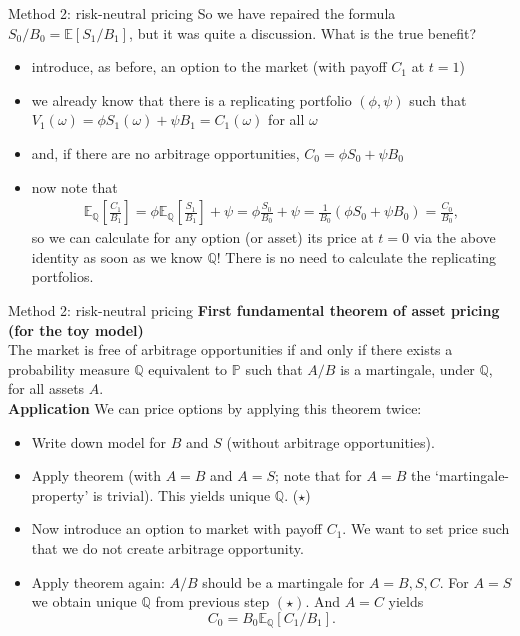 \documentclass[pdf, handout]{beamer}
\begin{document}
\begin{frame}{Method 2: risk-neutral pricing}
So we have repaired the formula  $S_0/B_0 = \mathbb{E}[S_1/B_1]$, but it 
was quite a discussion.  What is the true benefit?
\begin{itemize}
\item introduce, as before, an option to the market (with payoff $C_1$ at $t=1$)
\item we already know that there is a replicating portfolio $(\phi,\psi)$ such that $V_1(\omega) =\phi S_1(\omega) + \psi B_1= C_1(\omega)$ for all $\omega$
\item and, if there are no arbitrage opportunities, $C_0=\phi S_0 + \psi B_0$
\item now note that
\begin{align*}
\mathbb{E}_{\mathbb{Q}}\left[ \frac{C_1} {B_1} \right]
=\phi \mathbb{E}_{\mathbb{Q}}\left[ \frac{S_1} {B_1} \right]
+\psi = \phi \frac{S_0}{B_0} + \psi = \frac{1}{B_0}( \phi S_0 + \psi B_0)=\frac{C_0}{B_0}, 
\end{align*}
so we can calculate for any option (or asset) its price at $t=0$ via the above identity as soon as we know $\mathbb{Q}$! There is no need to calculate 
the replicating portfolios. 
\end{itemize}
\end{frame}

\begin{frame}{Method 2: risk-neutral pricing}
\textbf{First fundamental theorem of asset pricing (for the toy model)} \\
The market is free of arbitrage opportunities if and only if there exists a probability measure $\mathbb{Q}$ equivalent to $\mathbb{P}$
 such that $A/B$ is a martingale, under $\mathbb{Q}$, for all assets $A$.
\\ \vspace{.5cm}
\textbf{Application} We can price options by applying this theorem twice:
\begin{itemize}
\item Write down model for $B$ and $S$ (without arbitrage opportunities).
\item  Apply theorem (with $A= B$ and $A=S$; note that for $A=B$ the `martingale-property' is  trivial). This yields unique $\mathbb{Q}$.  ($\star$)
\item Now introduce an option to market with payoff $C_1$. We want to set
price such that we do not create arbitrage opportunity.
\item Apply theorem again: $A/B$ should be a martingale for $A=B, S, C$. For $A=S$ we obtain unique $\mathbb{Q}$ from previous step $(\star)$. 
And $A=C$ yields
\[
C_0 = B_0 \mathbb{E}_{\mathbb{Q}}[ C_1/B_1].
\]
\end{itemize}
\end{frame}
\end{document}
